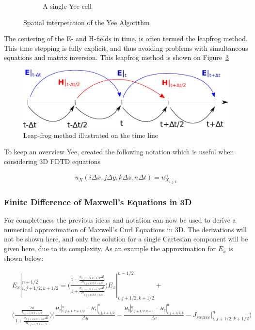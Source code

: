 \begin{figure}
\begin{subfigure}[b]{0.49\textwidth}
        \caption{A single Yee cell}
        \label{fig:yee-cell}
    \end{subfigure}
    \caption{Spatial interpetation of the Yee Algorithm}
    \label{fig:space-yee-algorithm}
\end{figure}

The centering of the E- and H-fields in time, is often termed the leapfrog method. This time stepping is fully explicit, and thus avoiding problems with simultaneous equations and matrix inversion. This leapfrog method is shown on Figure~\ref{fig:leap_frog} 

\begin{figure}[htbp]
    \centering
    \includegraphics[scale=0.7]{img/analysis/leap_frog}
    \caption{Leap-frog method illustrated on the time line}
    \label{fig:leap_frog}
\end{figure}

To keep an overview Yee, created the following notation which is useful when considering 3D FDTD equations

\begin{align}
  u_X (i \Delta x , j \Delta y, k \Delta z, n \Delta t) = u^n_{X_{i,j,k}}
\end{align}

\subsubsection{Finite Difference of Maxwell's Equations in 3D}
For completeness the previous ideas and notation can now be used to derive a numerical approximation of Maxwell's Curl Equations in 3D. The derivations will not be shown here, and only the solution for a single Cartesian component will be given here, due to its complexity. As an example the approximation for $E_x$ is shown below\cite{taflove2000computional}: 

\begin{align}
  &E_x |^{n+1/2}_{i,j+1/2,k+1/2} = \big( \frac{1-\frac{\sigma_{i,j+1/2,k+1/2} \Delta t}{2\epsilon_{i,j+1/2,k+1/2}}}{1+\frac{\sigma_{i,j+1/2,k+1/2} \Delta t}{2\epsilon_{i,j+1/2,k+1/2}}} \big) E_x |^{n-1/2}_{i,j+1/2,k+1/2}  + \\ &\big(  \frac{\frac{\Delta t}{\epsilon_{i,j+1/2,k+1/2}}}{1+\frac{\sigma_{i,j+1/2,k+1/2} \Delta t}{2\epsilon_{i,j+1/2,k+1/2}} }    \big) \big( \frac{H_z |^n_{i,j+1,k+1/2} - H_z |^n_{i,j,k+1/2} }{\Delta y} - \frac{H_y |^n_{i,j+1/2,k+1} - H_y |^n_{i,j+1/2,k} }{\Delta z} -J_{source}|^n_{i,j+1/2,k+1/2}  \big)
\end{align}

